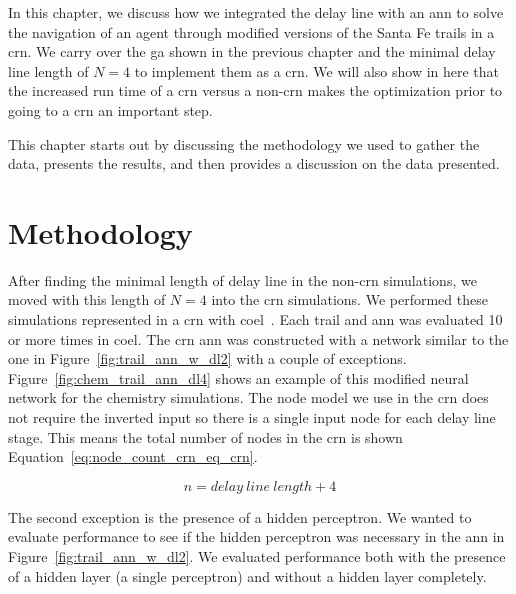 In this chapter, we discuss how we integrated the delay line with an \gls{ann} to solve the navigation of an agent through modified versions of the Santa Fe trails in a \gls{crn}. We carry over the \gls{ga} shown in the previous chapter and the minimal delay line length of $N=4$ to implement them as a \gls{crn}. We will also show in here that the increased run time of a \gls{crn} versus a non-\gls{crn} makes the optimization prior to going to a \gls{crn} an important step. 

This chapter starts out by discussing the methodology we used to gather the data, presents the results, and then provides a discussion on the data presented.

\section{Methodology}
After finding the minimal length of delay line in the non-\gls{crn} simulations, we moved with this length of $N=4$ into the \gls{crn} simulations. We performed these simulations represented in a \gls{crn} with \gls{coel}~\cite{Banda2014-qw}. Each trail and \gls{ann} was evaluated 10 or more times in \gls{coel}. The \gls{crn} \gls{ann} was constructed with a network similar to the one in Figure~\ref{fig:trail_ann_w_dl2} with a couple of exceptions. Figure~\ref{fig:chem_trail_ann_dl4} shows an example of this modified neural network for the chemistry simulations. The node model we use in the \gls{crn} does not require the inverted input so there is a single input node for each delay line stage. This means the total number of nodes in the \gls{crn} is shown Equation~\ref{eq:node_count_crn_eq_crn}.

\begin{equation} \label{eq:node_count_crn_eq_crn}
n = delay\:line\:length + 4
\end{equation}

The second exception is the presence of a hidden perceptron. We wanted to evaluate performance to see if the hidden perceptron was necessary in the \gls{ann} in Figure~\ref{fig:trail_ann_w_dl2}. We evaluated performance both with the presence of a hidden layer (a single perceptron) and without a hidden layer completely.

